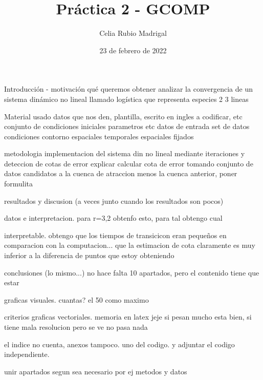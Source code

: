 \documentclass{article}
\author{Celia Rubio Madrigal}
\title{Práctica 2 - GCOMP}
\date{23 de febrero de 2022}
\begin{document}
	\maketitle
	
	Introducción - motivación
	qué queremos obtener
	analizar la convergencia de un sistema dinámico no lineal llamado logística que representa especies 2 3 lineas
	
	Material usado
	datos que nos den, plantilla, escrito en ingles a codificar, etc
	conjunto de condiciones iniciales parametros etc
	datos de entrada
	set de datos
	condiciones
	contorno espaciales temporales espaciales fijados
	
	
	metodologia
	implementacion del sistema din no lineal mediante iteraciones y deteccion de cotas de error explicar calcular cota de error tomando conjunto de datos candidatos a la cuenca de atraccion menos la cuenca anterior, poner formulita
	
	resultados y discusion (a veces junto cuando los resultados son pocos)

	datos e interpretacion.
	para r=3,2 obtenfo esto, para tal obtengo cual
	
	interpretable. obtengo que los tiempos de transicicon eran pequeños en comparacion con la computacion... que la estimacion de cota claramente es muy inferior a la diferencia de puntos que estoy obteniendo
	
	conclusiones (lo mismo...) no hace falta 10 apartados, pero el contenido tiene que estar
	
	graficas visuales. cuantas? el 50 como maximo
	
	criterios graficas vectoriales. memoria en latex jeje si pesan mucho esta bien, si tiene mala resolucion pero se ve no pasa nada
	
	el indice no cuenta, anexos tampoco. uno del codigo. y adjuntar el codigo independiente.	
	
	unir apartados segun sea necesario
	por ej metodos y datos
	
\end{document}
